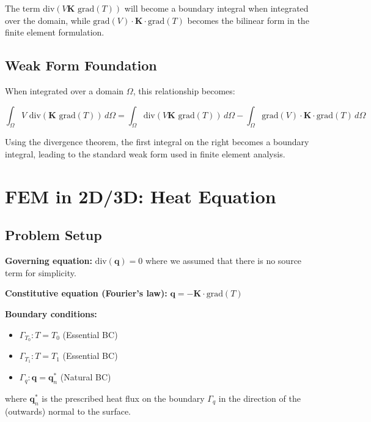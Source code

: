 \documentclass[
  11pt,
  a4paper,
]{scrbook}
\providecommand{\tightlist}{%
  \setlength{\itemsep}{0pt}\setlength{\parskip}{0pt}}\usepackage{longtable,booktabs,array}
\begin{document}
The term \(\text{div}(V \mathbf{K} \text{ grad}(T))\) will become a
boundary integral when integrated over the domain, while
\(\text{grad}(V) \cdot \mathbf{K} \cdot \text{grad}(T)\) becomes the
bilinear form in the finite element formulation.

\subsection{Weak Form Foundation}\label{weak-form-foundation}

When integrated over a domain \(\Omega\), this relationship becomes:

\[\int_\Omega V \text{ div}(\mathbf{K} \text{ grad}(T)) \, d\Omega = \int_\Omega \text{div}(V \mathbf{K} \text{ grad}(T)) \, d\Omega - \int_\Omega \text{grad}(V) \cdot \mathbf{K} \cdot \text{grad}(T) \, d\Omega\]

Using the divergence theorem, the first integral on the right becomes a
boundary integral, leading to the standard weak form used in finite
element analysis.

\section{FEM in 2D/3D: Heat Equation}\label{fem-in-2d3d-heat-equation}

\subsection{Problem Setup}\label{problem-setup}

\textbf{Governing equation:} \(\text{div}(\mathbf{q}) = 0\) where we
assumed that there is no source term for simplicity.

\textbf{Constitutive equation (Fourier's law):}
\(\mathbf{q} = -\mathbf{K} \cdot \text{grad}(T)\)

\textbf{Boundary conditions:}

\begin{itemize}
\tightlist
\item
  \(\Gamma_{T_0}: T = T_0\) (Essential BC)
\item
  \(\Gamma_{T_1}: T = T_1\) (Essential BC)
\item
  \(\Gamma_q: \mathbf{q} = \mathbf{q}^*_n\) (Natural BC)
\end{itemize}

where \(\mathbf{q}^*_n\) is the prescribed heat flux on the boundary
\(\Gamma_q\) in the direction of the (outwards) normal to the surface.
\end{document}
